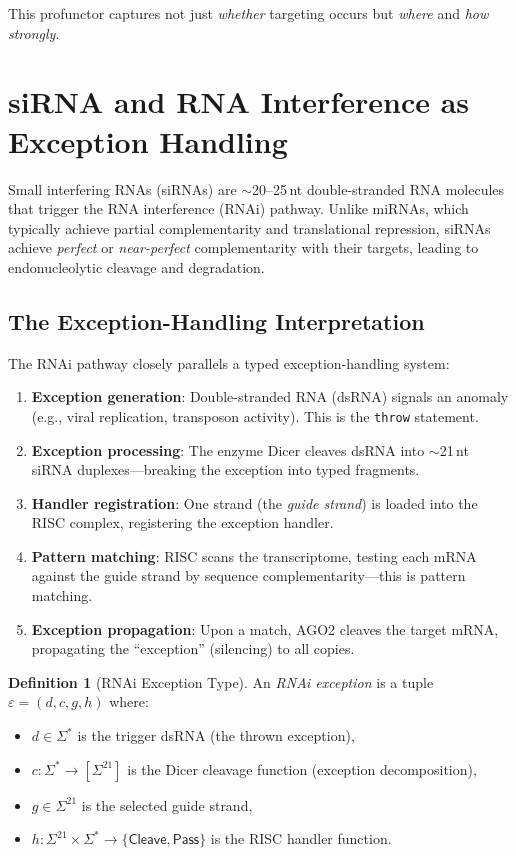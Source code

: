 \documentclass[12pt,a4paper]{article}
\theoremstyle{definition}
\newtheorem{definition}[theorem]{Definition}
\begin{document}
This profunctor captures not just \emph{whether} targeting occurs but
\emph{where} and \emph{how strongly}.

\section{siRNA and RNA Interference as Exception Handling}\label{sec:sirna}

Small interfering RNAs (siRNAs) are $\sim$20--25\,nt double-stranded
RNA molecules that trigger the RNA interference (RNAi) pathway.  Unlike
miRNAs, which typically achieve partial complementarity and translational
repression, siRNAs achieve \emph{perfect} or \emph{near-perfect}
complementarity with their targets, leading to endonucleolytic cleavage
and degradation.

\subsection{The Exception-Handling Interpretation}

The RNAi pathway closely parallels a typed exception-handling system:

\begin{enumerate}[label=(\roman*)]
  \item \textbf{Exception generation}: Double-stranded RNA (dsRNA)
    signals an anomaly (e.g., viral replication, transposon activity).
    This is the \texttt{throw} statement.
  \item \textbf{Exception processing}: The enzyme Dicer cleaves dsRNA
    into $\sim$21\,nt siRNA duplexes---breaking the exception into
    typed fragments.
  \item \textbf{Handler registration}: One strand (the \emph{guide
    strand}) is loaded into the RISC complex, registering the
    exception handler.
  \item \textbf{Pattern matching}: RISC scans the transcriptome,
    testing each mRNA against the guide strand by sequence
    complementarity---this is pattern matching.
  \item \textbf{Exception propagation}: Upon a match, AGO2 cleaves the
    target mRNA, propagating the ``exception'' (silencing) to all
    copies.
\end{enumerate}

\begin{definition}[RNAi Exception Type]\label{def:rnai-exception}
An \emph{RNAi exception} is a tuple $\varepsilon = (d, c, g, h)$ where:
\begin{itemize}
  \item $d \in \Sigma^*$ is the trigger dsRNA (the thrown exception),
  \item $c : \Sigma^* \to [\Sigma^{21}]$ is the Dicer cleavage function
    (exception decomposition),
  \item $g \in \Sigma^{21}$ is the selected guide strand,
  \item $h : \Sigma^{21} \times \Sigma^* \to \{\mathsf{Cleave},
    \mathsf{Pass}\}$ is the RISC handler function.
\end{itemize}
\end{definition}
\end{document}
